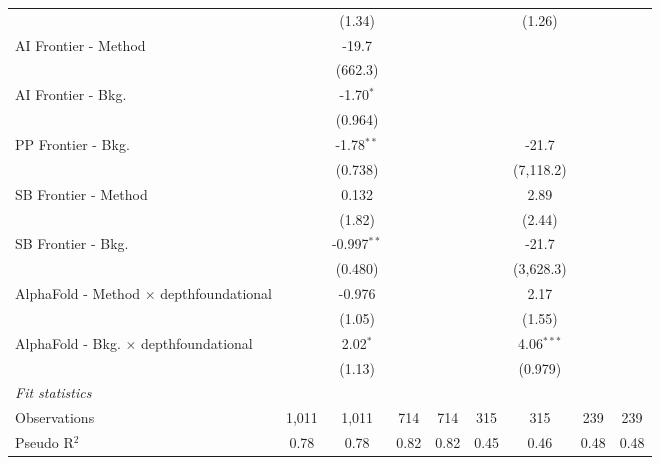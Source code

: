 \begin{tabular}{lcccccccc}
                                                  &         & (1.34)        &      &      &            & (1.26)       &      &   \\   
   AI Frontier - Method                           &         & -19.7         &      &      &            &              &      &   \\   
                                                  &         & (662.3)       &      &      &            &              &      &   \\   
   AI Frontier - Bkg.                             &         & -1.70$^{*}$   &      &      &            &              &      &   \\   
                                                  &         & (0.964)       &      &      &            &              &      &   \\   
   PP Frontier - Bkg.                             &         & -1.78$^{**}$  &      &      &            & -21.7        &      &   \\   
                                                  &         & (0.738)       &      &      &            & (7,118.2)    &      &   \\   
   SB Frontier - Method                           &         & 0.132         &      &      &            & 2.89         &      &   \\   
                                                  &         & (1.82)        &      &      &            & (2.44)       &      &   \\   
   SB Frontier - Bkg.                             &         & -0.997$^{**}$ &      &      &            & -21.7        &      &   \\   
                                                  &         & (0.480)       &      &      &            & (3,628.3)    &      &   \\   
   AlphaFold - Method $\times$ depthfoundational  &         & -0.976        &      &      &            & 2.17         &      &   \\   
                                                  &         & (1.05)        &      &      &            & (1.55)       &      &   \\   
   AlphaFold - Bkg. $\times$ depthfoundational    &         & 2.02$^{*}$    &      &      &            & 4.06$^{***}$ &      &   \\   
                                                  &         & (1.13)        &      &      &            & (0.979)      &      &   \\   
   \midrule
   \emph{Fit statistics}\\
   Observations                                   & 1,011   & 1,011         & 714  & 714  & 315        & 315          & 239  & 239\\  
   Pseudo R$^2$                                   & 0.78    & 0.78          & 0.82 & 0.82 & 0.45       & 0.46         & 0.48 & 0.48\\  
   

\end{tabular}
